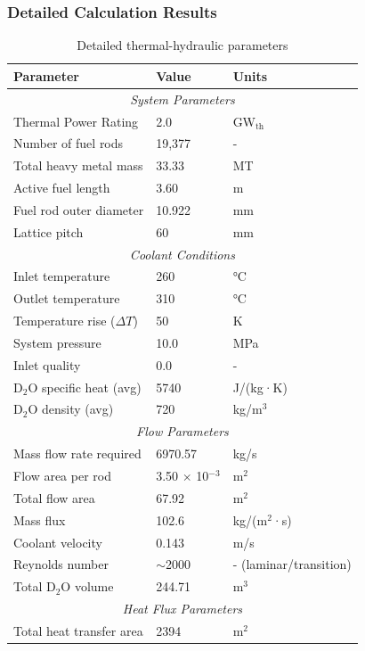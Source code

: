 \subsubsection{Detailed Calculation Results}

\begin{table}[H]
\centering
\caption{Detailed thermal-hydraulic parameters}
\begin{tabular}{|l|l|l|}
\hline
\textbf{Parameter} & \textbf{Value} & \textbf{Units} \\
\hline
\multicolumn{3}{|c|}{\textit{System Parameters}} \\
\hline
Thermal Power Rating & 2.0 & GW$_{\text{th}}$ \\
Number of fuel rods & 19,377 & - \\
Total heavy metal mass & 33.33 & MT \\
Active fuel length & 3.60 & m \\
Fuel rod outer diameter & 10.922 & mm \\
Lattice pitch & 60 & mm \\
\hline
\multicolumn{3}{|c|}{\textit{Coolant Conditions}} \\
\hline
Inlet temperature & 260 & °C \\
Outlet temperature & 310 & °C \\
Temperature rise ($\Delta T$) & 50 & K \\
System pressure & 10.0 & MPa \\
Inlet quality & 0.0 & - \\
D$_2$O specific heat (avg) & 5740 & J/(kg·K) \\
D$_2$O density (avg) & 720 & kg/m$^3$ \\
\hline
\multicolumn{3}{|c|}{\textit{Flow Parameters}} \\
\hline
Mass flow rate required & 6970.57 & kg/s \\
Flow area per rod & 3.50 $\times$ 10$^{-3}$ & m$^2$ \\
Total flow area & 67.92 & m$^2$ \\
Mass flux & 102.6 & kg/(m$^2$·s) \\
Coolant velocity & 0.143 & m/s \\
Reynolds number & $\sim$2000 & - (laminar/transition) \\
Total D$_2$O volume & 244.71 & m$^3$ \\
\hline
\multicolumn{3}{|c|}{\textit{Heat Flux Parameters}} \\
\hline
Total heat transfer area & 2394 & m$^2$ \\

\end{tabular}
\end{table}
